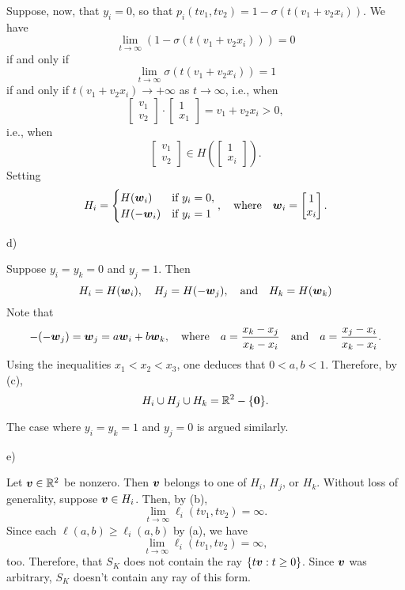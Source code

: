 \documentclass[12pt]{amsart}
\begin{document}
    Suppose, now, that $y_i=0$, so that $p_i(tv_1, tv_2) = 1-\sigma(t(v_1+v_2x_i))$.
    We have
    \[
        \lim_{t\to\infty}(1-\sigma(t(v_1+v_2x_i))) = 0
    \]
    if and only if
    \[
        \lim_{t\to\infty}\sigma(t(v_1+v_2x_i)) = 1
    \]
    if and only if $t(v_1+v_2x_i)\to +\infty$ as $t\to\infty$, i.e., when
    \[
        \begin{bmatrix}
            v_1\\v_2
        \end{bmatrix}\cdot\begin{bmatrix}
            1\\x_1
        \end{bmatrix} = v_1+v_2x_i > 0,
    \]
    i.e., when
    \[
    \begin{bmatrix}
        v_1\\v_2
    \end{bmatrix}
    \in H\left(
    \begin{bmatrix}
    1\\x_i
    \end{bmatrix}
    \right).
    \]
    Setting
    \[
    H_i = \begin{cases}H(\boldsymbol{w}_i) &\text{if $y_i=0$},\\
        H(-\boldsymbol{w}_i) &\text{if $y_i=1$}
    \end{cases},\quad\text{where}\quad
    \boldsymbol{w}_i = \begin{bmatrix}
        1\\x_i
    \end{bmatrix}.
    \]

    d)

            Suppose $y_i=y_k=0$ and $y_j=1$.
            Then
            \[
                H_i=H(\boldsymbol{w}_i),\quad H_j=H(-\boldsymbol{w}_j),\quad\text{and}\quad
                H_k=H(\boldsymbol{w}_k)
            \]
            Note that
            \[
                -(-\boldsymbol{w}_j) = \boldsymbol{w}_j = a\boldsymbol{w}_i + b\boldsymbol{w}_k,\quad\text{where}\quad
                a=\frac{x_k-x_j}{x_k-x_i}\quad\text{and}\quad
                a=\frac{x_j-x_i}{x_k-x_i}.
            \]
            Using the inequalities $x_1<x_2<x_3$, one deduces that $0<a, b<1$.
            Therefore, by (c),
            \[
                H_i\cup H_j\cup H_k = \mathbb{R}^2 - \{\boldsymbol{0}\}.
            \]

            The case where $y_i=y_k=1$ and $y_j=0$ is argued similarly.

        e)

        Let $\boldsymbol{v}\in\mathbb{R}^2$ be nonzero.
        Then $\boldsymbol{v}$ belongs to one of $H_i$, $H_j$, or $H_k$.
        Without loss of generality, suppose $\boldsymbol{v}\in H_i$. Then, by (b),
        \[
            \lim_{t\to\infty}\ell_i(tv_1, tv_2) = \infty.
        \]
        Since each $\ell(a, b)\geq \ell_i(a, b)$ by (a), we have
        \[
            \lim_{t\to\infty}\ell_i(tv_1, tv_2) = \infty,
        \]
        too. Therefore, that $S_K$ does not contain the ray $\{t\boldsymbol{v}:t\geq 0\}$.
        Since $\boldsymbol{v}$ was arbitrary, $S_K$ doesn't contain any ray of this form.
\end{document}
